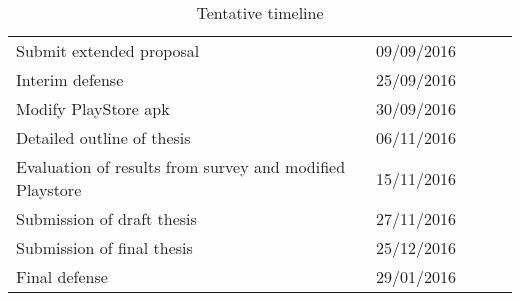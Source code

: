 \begin{table}[!htbp]
{\begin{tabular}{@{}lllll@{}}
Submit extended proposal                                                  & 09/09/2016                           &  &  &  \\
Interim defense                                                           & 25/09/2016                           &  &  &  \\
Modify PlayStore apk 													  & 30/09/2016                           &  &  &  \\
Detailed outline of thesis                                                & 06/11/2016                           &  &  &  \\
Evaluation of results from survey and modified Playstore                  & 15/11/2016                           &  &  &  \\
Submission of draft thesis                                                & 27/11/2016                           &  &  &  \\
Submission of final thesis                                                & 25/12/2016                           &  &  &  \\
Final defense                                                             & 29/01/2016                           &  &  &  \\ \bottomrule
\end{tabular}%
}
\caption{Tentative timeline}
\label{tentative-timeline}
\end{table}
